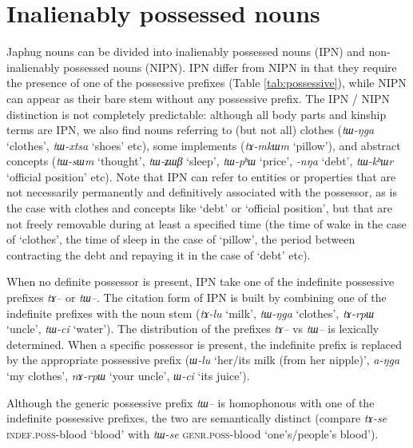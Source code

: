 \documentclass[oldfontcommands,oneside,a4paper,11pt]{article}
\newcommand{\ipa}[1]{{\phon\textit{#1}}} %
\begin{document}
 \section{Inalienably possessed nouns} 
Japhug nouns can be divided into inalienably possessed nouns (IPN) and non-inalienably possessed nouns (NIPN). IPN differ from NIPN in that they require the presence of one of the possessive prefixes (Table \ref{tab:possessive}), while NIPN can appear as their bare stem without any possessive prefix. The IPN / NIPN distinction is not completely predictable: although all body parts and kinship terms are IPN, we also find nouns referring to (but not all) clothes (\ipa{tɯ-ŋga} `clothes', \ipa{tɯ-xtsa} `shoes' etc), some implements (\ipa{tɤ-mkɯm} `pillow'), and abstract concepts (\ipa{tɯ-sɯm} `thought', \ipa{tɯ-ʑɯβ} `sleep', \ipa{tɯ-pʰɯ} `price', \ipa{-nŋa} `debt', \ipa{tɯ-kʰɯr} `official position' etc). Note that IPN can refer to entities or properties that are not necessarily permanently and definitively associated with the possessor, as is the case with clothes and concepts like `debt' or `official position', but that are not freely removable during at least a specified time (the time of wake in the case of `clothes', the time of sleep in the case of `pillow', the period between contracting the debt and repaying it in the case of `debt' etc).

When no definite possessor is present, IPN take one of the indefinite possessive prefixes \ipa{tɤ--} or \ipa{tɯ--}. The citation form of IPN is built by combining one of the indefinite prefixes with the noun stem (\ipa{tɤ-lu} `milk', \ipa{tɯ-ŋga} `clothes', \ipa{tɤ-rpɯ} `uncle', \ipa{tɯ-ci} `water'). The distribution of the prefixes \ipa{tɤ--} vs \ipa{tɯ--} is lexically determined.  When a specific possessor is present, the indefinite prefix is replaced by the appropriate possessive prefix (\ipa{ɯ-lu} `her/its milk (from her nipple)', \ipa{a-ŋga} `my clothes', \ipa{nɤ-rpɯ} `your uncle', \ipa{ɯ-ci} `its juice'). 

Although the generic possessive prefix \ipa{tɯ--} is homophonous with one of the indefinite possessive prefixes, the two are semantically distinct (compare \ipa{tɤ-se} \textsc{indef.poss}-blood `blood' with \ipa{tɯ-se} \textsc{genr.poss}-blood `one's/people's blood').
\end{document}
